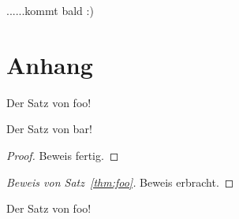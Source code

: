 ......kommt bald :)

\newpage
\section{Anhang}

\begin{theorem}
	Der Satz von foo!
\end{theorem}
\begin{theorem}
	Der Satz von bar!
	\label{thm:foo}
\end{theorem}
\begin{proof}
	Beweis fertig.
\end{proof}
\begin{proof}[Beweis von Satz~\ref{thm:foo}]
	Beweis erbracht.
\end{proof}


\begin{Bemerkung}
	Der Satz von foo!

\end{Bemerkung}


